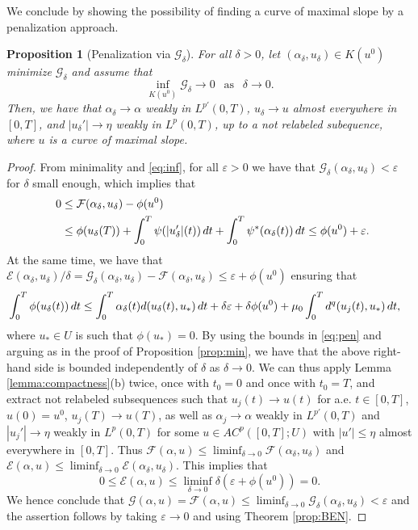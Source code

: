 \documentclass[10pt,a4paper]{amsart}
\newcommand{\epsi}{\varepsilon}
\newcommand{\GG}{{\mathcal G}}
\newcommand{\EE}{{\mathcal E}}
\newcommand{\FF}{{\mathcal F}}
\renewcommand{\d}{{\rm d}}
\newtheorem{proposition}[theorem]{Proposition}
\begin{document}
 We conclude by showing the possibility of finding a curve of maximal
 slope by a penalization approach. 

 \begin{proposition}[Penalization via $\GG_\delta$]\label{prop:pen2}
   For all $\delta>0$, let $(\alpha_\delta,u_\delta)\in K(u^0)$
   minimize $\GG_\delta$ and assume that
   \begin{equation}\label{eq:inf}
    \inf_{K(u^0)} \GG_\delta \to  0  \ \ \text{ as } \ \ \delta \to 0.
\end{equation}
Then, we have that $\alpha_\delta \to \alpha$ weakly in $L^{p'}(0,T)$, $u_\delta
\to u$ almost everywhere in $[0,T]$,  and $|u_\delta'| \to \eta$ weakly in
$L^p(0,T)$, up to a not relabeled subequence, where $u$ is a curve of maximal slope.  
\end{proposition}

\begin{proof}
 From minimality and \eqref{eq:inf}, for all $\epsi >0 $ we have that $\GG_\delta
 (\alpha_\delta,u_\delta)  <\epsi$ for $\delta$ small enough,
  which implies that
  \begin{align}
     0 &\le \FF(\alpha_\delta, u_\delta)-\phi(u^0)  \nonumber\\
    \quad &\leq \phi(u_\delta(T)) + \int_0^T \psi(|u_\delta'|(t))\, \d t +
    \int_0^T\psi^*(\alpha_\delta(t))\, \d t \leq \phi(u^0) +\epsi. \label{eq:pen}
  \end{align}
  At the same time, we have that $ \EE(\alpha_\delta,u_\delta)/\delta=  \GG_\delta
 (\alpha_\delta,u_\delta) -\FF  
 (\alpha_\delta,u_\delta) \leq \epsi +\phi(u^0)$ ensuring that
 \begin{align*}
   & \int_0^T \phi(u_\delta(t))\, \d t \leq \int_0^T \alpha_\delta(t)
     d(u_\delta(t),u_*)\, \d t + \delta \epsi +\delta \phi(u^0) +
     { \mu_0  }\int_0^T d^q(u_j(t), u_*) \, \d t, 
 \end{align*} 
  where $u_* \in U$ is such that $\phi(u_*)=0$. 
 By using the bounds in \eqref{eq:pen} and arguing as in
  the proof of Proposition \ref{prop:min},  we have that the above right-hand side is bounded independently of $\delta$ as
 $\delta \to 0$.  We can thus apply Lemma \ref{lemma:compactness}(b) twice, once with $t_0=0$ and once with $t_0=T$, and extract not relabeled subsequences such that $u_j (t) \to u(t)$ for
a.e. $t \in [0,T]$, $u(0)=u^0$, $u_j(T) \to u(T)$, as well as  $\alpha_j \to \alpha$ weakly in
$L^{p'}(0,T)$ and $|u_j'|\to \eta$ weakly in $L^p(0,T)$ for some $u
\in AC^p([0,T];U)$ with $|u'| \le \eta$  almost everywhere in $[0,T]$. 
 Thus  $\FF(\alpha,u) \leq \liminf_{\delta \to
  0}\FF(\alpha_\delta,u_\delta)$ and  $\EE(\alpha,u) \leq \liminf_{\delta \to
  0}\EE (\alpha_\delta,u_\delta)$. This implies that $$0\leq \EE(\alpha,u)  \leq \liminf_{\delta \to
  0} \delta(\epsi+\phi(u^0)) =0.$$
We hence conclude that $\GG(\alpha,u) =\FF(\alpha,u)  \leq \liminf_{\delta \to
  0} \GG_\delta(\alpha_\delta,u_\delta)<\epsi$ and the assertion
follows by taking $\epsi \to 0$  and using Theorem \ref{prop:BEN}.
\end{proof}
\end{document}
